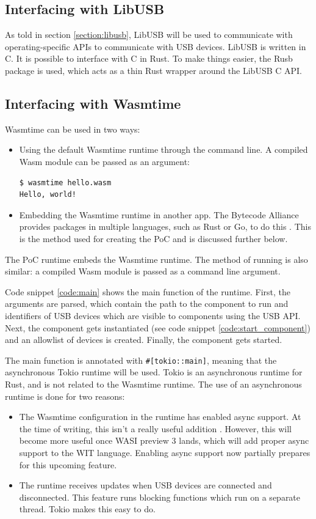 \subsection{Interfacing with LibUSB}
As told in section \ref{section:libusb}, LibUSB will be used to communicate with operating-specific APIs to communicate with USB devices. LibUSB is written in C. It is possible to interface with C in Rust. To make things easier, the Rusb \cite{rusb} package is used, which acts as a thin Rust wrapper around the LibUSB C API.

\subsection{Interfacing with Wasmtime}
Wasmtime can be used in two ways: 
\begin{itemize}
\item Using the default Wasmtime runtime through the command line. A compiled \acrshort{Wasm} module can be passed as an argument:
\begin{verbatim}
$ wasmtime hello.wasm
Hello, world!
\end{verbatim}
\item Embedding the Wasmtime runtime in another app. The Bytecode Alliance provides packages in multiple languages, such as Rust or Go, to do this \cite{wasmtime_website}. This is the method used for creating the \acrshort{PoC} and is discussed further below.
\end{itemize}

The \acrshort{PoC} runtime embeds the Wasmtime runtime. The method of running is also similar: a compiled \acrshort{Wasm} module is passed as a command line argument.

Code snippet \ref{code:main} shows the main function of the runtime. First, the arguments are parsed, which contain the path to the component to run and identifiers of USB devices which are visible to components using the \acrshort{USB} \acrshort{API}. Next, the component gets instantiated (see code snippet \ref{code:start_component}) and an allowlist of devices is created. Finally, the component gets started.

The main function is annotated with \texttt{\#[tokio::main]}, meaning that the asynchronous Tokio runtime \cite{tokio} will be used. Tokio is an asynchronous runtime for Rust, and is not related to the Wasmtime runtime. The use of an asynchronous runtime is done for two reasons:
\begin{itemize}
\item The Wasmtime configuration in the runtime has enabled async support. At the time of writing, this isn't a really useful addition \cite{wasmtime_async_config}. However, this will become more useful once \acrshort{WASI} preview 3 lands, which will add proper async support to the \acrshort{WIT} language. Enabling async support now partially prepares for this upcoming feature.

\item The runtime receives updates when USB devices are connected and disconnected. This feature runs blocking functions which run on a separate thread. Tokio makes this easy to do.\\
\end{itemize}


